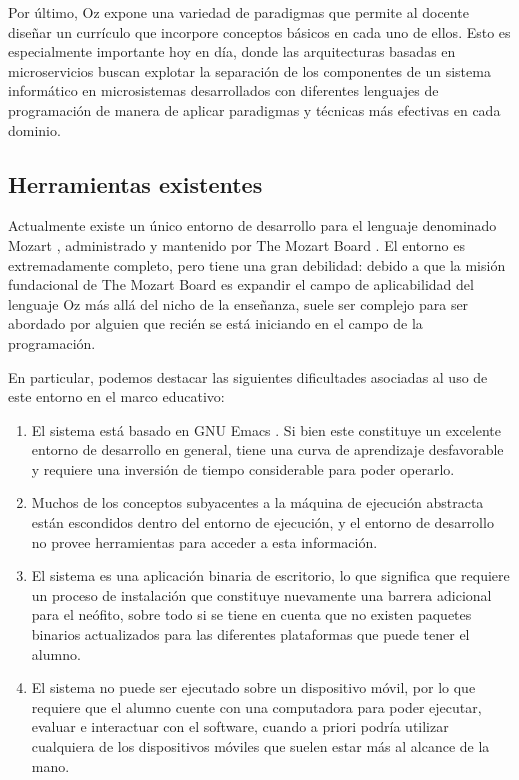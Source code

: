 \documentclass[a4paper,11pt]{article}
\begin{document}
Por último, Oz \cite{oz} expone una variedad de paradigmas que permite al
docente diseñar un currículo que incorpore conceptos básicos en cada uno de
ellos. Esto es especialmente importante hoy en día, donde las arquitecturas
basadas en microservicios buscan explotar la separación de los componentes de
un sistema informático en microsistemas desarrollados con diferentes lenguajes
de programación de manera de aplicar paradigmas y técnicas más efectivas en
cada dominio.

\subsection{Herramientas existentes}

Actualmente existe un único entorno de desarrollo para el lenguaje denominado
Mozart \cite{mozart}, administrado y mantenido por The Mozart Board
\cite{mozboard}. El entorno es extremadamente completo, pero tiene una gran
debilidad: debido a que la misión fundacional de The Mozart Board es expandir
el campo de aplicabilidad del lenguaje Oz más allá del nicho de la enseñanza,
suele ser complejo para ser abordado por alguien que recién se está iniciando
en el campo de la programación.

En particular, podemos destacar las siguientes dificultades asociadas al uso de
este entorno en el marco educativo:

\begin{enumerate}

  \item El sistema está basado en GNU Emacs \cite{emacs}. Si bien este
    constituye un excelente entorno de desarrollo en general, tiene una curva
    de aprendizaje desfavorable y requiere una inversión de tiempo considerable
    para poder operarlo.

  \item Muchos de los conceptos subyacentes a la máquina de ejecución abstracta
    están escondidos dentro del entorno de ejecución, y el entorno de desarrollo
    no provee herramientas para acceder a esta información.

  \item El sistema es una aplicación binaria de escritorio, lo que significa que
    requiere un proceso de instalación que constituye nuevamente una barrera
    adicional para el neófito, sobre todo si se tiene en cuenta que no existen
    paquetes binarios actualizados para las diferentes plataformas que puede
    tener el alumno.

  \item El sistema no puede ser ejecutado sobre un dispositivo móvil, por lo que
    requiere que el alumno cuente con una computadora para poder ejecutar,
    evaluar e interactuar con el software, cuando a priori podría utilizar
    cualquiera de los dispositivos móviles que suelen estar más al alcance de la
    mano.

\end{enumerate}
\end{document}

